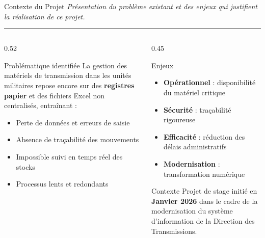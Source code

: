 \documentclass[
  aspectratio=169,       %
  xcolor=dvipsnames,     %
  t                      %
]{beamer}
\newcommand{\framedesc}[1]{%
  {\small\itshape\textcolor{PrimaryDark!80}{#1}}\par%
  \vspace{1pt}%
  {\color{PrimaryMid}\rule{\textwidth}{0.4pt}}%
  \vspace{4pt}%
}
\begin{document}
\begin{frame}{Contexte du Projet}
  \framedesc{Présentation du problème existant et des enjeux qui justifient la réalisation de ce projet.}

  \begin{columns}[T]

    \begin{column}{0.52\textwidth}
      \begin{block}{Problématique identifiée}
        La gestion des matériels de transmission dans les unités militaires
        repose encore sur des \textbf{registres papier} et des fichiers
        Excel non centralisés, entraînant :
        \begin{itemize}
          \item Perte de données et erreurs de saisie
          \item Absence de traçabilité des mouvements
          \item Impossible suivi en temps réel des stocks
          \item Processus lents et redondants
        \end{itemize}
      \end{block}
    \end{column}

    \begin{column}{0.45\textwidth}
      \begin{alertblock}{Enjeux}
        \begin{itemize}
          \item \textbf{Opérationnel} : disponibilité du matériel critique
          \item \textbf{Sécurité} : traçabilité rigoureuse
          \item \textbf{Efficacité} : réduction des délais administratifs
          \item \textbf{Modernisation} : transformation numérique
        \end{itemize}
      \end{alertblock}

      \vspace{0.3cm}

      \begin{exampleblock}{Contexte}
        Projet de stage initié en \textbf{Janvier 2026} dans le cadre
        de la modernisation du système d'information de la
        Direction des Transmissions.
      \end{exampleblock}
    \end{column}

  \end{columns}
\end{frame}
\end{document}
